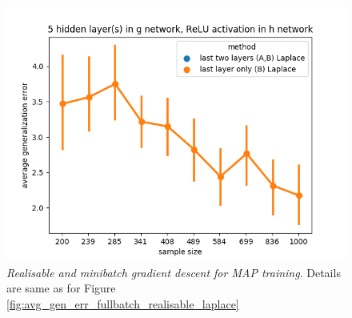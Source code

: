 \documentclass[11pt]{article}
\numberwithin{equation}{section}
\theoremstyle{plain}
\theoremstyle{definition}
\begin{document}
\begin{figure}[t!]
\begin{center}
		\includegraphics[scale=0.45]{laplace_taskid15.png}
	\end{center}
	\caption{\textit{Realisable and minibatch gradient descent for MAP training}. Details are same as for Figure \ref{fig:avg_gen_err_fullbatch_realisable_laplace}}
	\label{fig:avg_gen_err_minibatch_realisable_laplace}
\end{figure}
\end{document}
